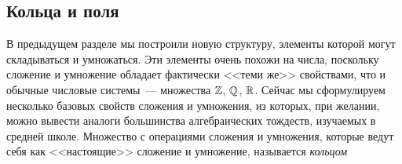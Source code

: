 \subsection{Кольца и поля}


В предыдущем разделе мы построили новую структуру, элементы которой
могут складываться и
умножаться. Эти элементы очень похожи на числа, поскольку сложение и
умножение обладает фактически <<теми же>> свойствами, что и обычные
числовые системы~--- множества $\mathbb Z$, $\mathbb Q$, $\mathbb R$. Сейчас мы
сформулируем несколько базовых свойств сложения и умножения, из
которых, при желании, можно вывести аналоги большинства алгебраических
тождеств, изучаемых в средней школе. Множество с операциями сложения и
умножения, которые ведут себя как <<настоящие>> сложение и умножение,
называется {\it кольцом}

